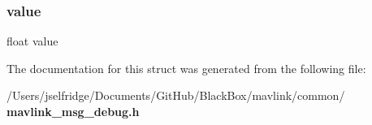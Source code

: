 \subsubsection{value}
{\footnotesize\ttfamily float value}



The documentation for this struct was generated from the following file\+:\begin{DoxyCompactItemize}
\item 
/\+Users/jselfridge/\+Documents/\+Git\+Hub/\+Black\+Box/mavlink/common/\textbf{ mavlink\+\_\+msg\+\_\+debug.\+h}\end{DoxyCompactItemize}
